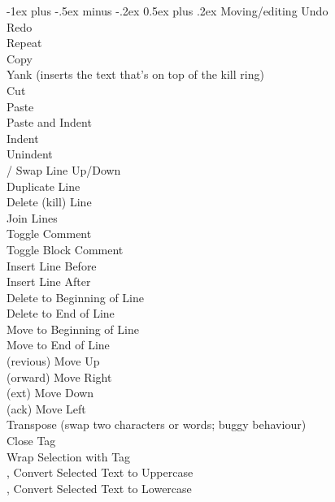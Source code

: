 \documentclass[10pt,landscape]{article}
\makeatletter
\renewcommand{\section}{\@startsection{section}{1}{0mm}%
                                {-1ex plus -.5ex minus -.2ex}%
                                {0.5ex plus .2ex}%
                                {\normalfont\large\bfseries}}
\makeatother
\begin{document}
\begin{multicols}{3}
\section{Moving/editing}
 Undo \\
 Redo \\
 Repeat \\
 Copy \\
 Yank (inserts the text that's on top of the kill ring)\\
 Cut \\
 Paste \\
 Paste and Indent \\
\keys{\cmd+]} Indent \\
\keys{\cmd+[} Unindent \\
\keys{\cmd+\ctrl+\arrowkeyup}/\keys{\arrowkeydown} Swap Line Up/Down \\
 Duplicate Line \\
 Delete (kill) Line \\
 Join Lines \\
\keys{\cmd+/} Toggle Comment \\
\keys{\cmd+\Alt+/} Toggle Block Comment \\
\keys{\cmd+\shift+\return} Insert Line Before \\
\keys{\cmd+\return} Insert Line After \\
\keys{\cmd+\backspace} Delete to Beginning of Line \\
 Delete to End of Line \\
 Move to Beginning of Line \\
 Move to End of Line \\
(revious) Move Up \\
(orward) Move Right \\
(ext) Move Down \\
(ack) Move Left \\
 Transpose (swap two characters or words; buggy behaviour) \\
 Close Tag \\
 Wrap Selection with Tag \\
,  Convert Selected Text to Uppercase \\
,  Convert Selected Text to Lowercase \\

\end{multicols}
\end{document}
